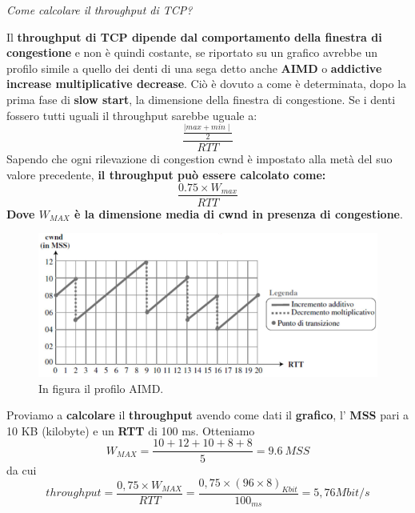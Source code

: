 \documentclass[11pt,a4paper]{article}
\theoremstyle{definition}
\begin{document}
\newpage
\begin{flushleft}
	\textit{Come calcolare il throughput di TCP?}
\end{flushleft}
Il \textbf{throughput di TCP dipende dal comportamento della finestra di congestione} e non è quindi costante, se riportato su un grafico avrebbe un profilo simile a quello dei denti di una sega detto anche \textbf{AIMD} o \textbf{addictive increase multiplicative decrease}. Ciò è dovuto a come è determinata, dopo la prima fase di \textbf{slow start}, la dimensione della finestra di congestione. Se i denti fossero tutti uguali il throughput sarebbe uguale a:\[\frac{\frac{\mid max + min \mid }{2}}{RTT}\]
Sapendo che ogni rilevazione di congestion cwnd è impostato alla metà del suo valore precedente, \textbf{il throughput può essere calcolato come:}
\[\frac{ 0.75 \times W_{max}}{RTT}\]
\textbf{Dove $W_{MAX}$ è la dimensione media di cwnd in presenza di congestione}.
\begin{figure}[!h]
	\includegraphics[scale=0.6]{Immagini/Cwnd_ex.png}
	\centering
	\caption{In figura il profilo AIMD.}
\end{figure}\newline
Proviamo a \textbf{calcolare} il \textbf{throughput} avendo come dati il \textbf{grafico}, l' \textbf{MSS} pari a 10 KB (kilobyte) e un \textbf{RTT} di 100 ms. Otteniamo
\[W_{MAX} = \frac{10 + 12 + 10 + 8 + 8}{5} = 9.6 \ MSS\]
da cui
\[throughput =  \frac{0,75 \times W_{MAX}}{RTT}  = \frac{0,75 \times (96 \times 8)_{Kbit}}{100_{ms}} = 5,76 Mbit/s\]
\newpage
\end{document}
